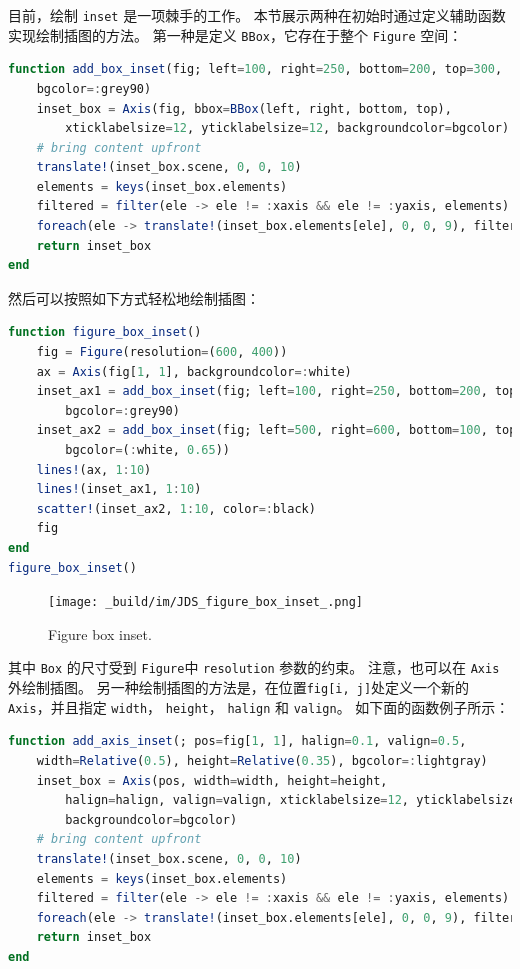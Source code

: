 \documentclass[
  notoc %
]{tufte-book}
\newcommand{\passthrough}[1]{#1}
\begin{document}
目前，绘制 \passthrough{\lstinline!inset!} 是一项棘手的工作。
本节展示两种在初始时通过定义辅助函数实现绘制插图的方法。 第一种是定义
\passthrough{\lstinline!BBox!}，它存在于整个
\passthrough{\lstinline!Figure!} 空间：

\begin{lstlisting}[language=Julia]
function add_box_inset(fig; left=100, right=250, bottom=200, top=300,
    bgcolor=:grey90)
    inset_box = Axis(fig, bbox=BBox(left, right, bottom, top),
        xticklabelsize=12, yticklabelsize=12, backgroundcolor=bgcolor)
    # bring content upfront
    translate!(inset_box.scene, 0, 0, 10)
    elements = keys(inset_box.elements)
    filtered = filter(ele -> ele != :xaxis && ele != :yaxis, elements)
    foreach(ele -> translate!(inset_box.elements[ele], 0, 0, 9), filtered)
    return inset_box
end
\end{lstlisting}

然后可以按照如下方式轻松地绘制插图：

\begin{lstlisting}[language=Julia]
function figure_box_inset()
    fig = Figure(resolution=(600, 400))
    ax = Axis(fig[1, 1], backgroundcolor=:white)
    inset_ax1 = add_box_inset(fig; left=100, right=250, bottom=200, top=300,
        bgcolor=:grey90)
    inset_ax2 = add_box_inset(fig; left=500, right=600, bottom=100, top=200,
        bgcolor=(:white, 0.65))
    lines!(ax, 1:10)
    lines!(inset_ax1, 1:10)
    scatter!(inset_ax2, 1:10, color=:black)
    fig
end
figure_box_inset()
\end{lstlisting}

\begin{figure}
\hypertarget{fig:figure_box_inset}{%
\centering
\texttt{[image: \_build/im/JDS\_figure\_box\_inset\_.png]}
\caption{Figure box inset.}\label{fig:figure_box_inset}
}
\end{figure}

其中 \passthrough{\lstinline!Box!} 的尺寸受到
\passthrough{\lstinline!Figure!}中 \passthrough{\lstinline!resolution!}
参数的约束。 注意，也可以在 \passthrough{\lstinline!Axis!} 外绘制插图。
另一种绘制插图的方法是，在位置\passthrough{\lstinline!fig[i, j]!}处定义一个新的
\passthrough{\lstinline!Axis!}，并且指定
\passthrough{\lstinline!width!}， \passthrough{\lstinline!height!}，
\passthrough{\lstinline!halign!} 和 \passthrough{\lstinline!valign!}。
如下面的函数例子所示：

\begin{lstlisting}[language=Julia]
function add_axis_inset(; pos=fig[1, 1], halign=0.1, valign=0.5,
    width=Relative(0.5), height=Relative(0.35), bgcolor=:lightgray)
    inset_box = Axis(pos, width=width, height=height,
        halign=halign, valign=valign, xticklabelsize=12, yticklabelsize=12,
        backgroundcolor=bgcolor)
    # bring content upfront
    translate!(inset_box.scene, 0, 0, 10)
    elements = keys(inset_box.elements)
    filtered = filter(ele -> ele != :xaxis && ele != :yaxis, elements)
    foreach(ele -> translate!(inset_box.elements[ele], 0, 0, 9), filtered)
    return inset_box
end
\end{lstlisting}
\end{document}
